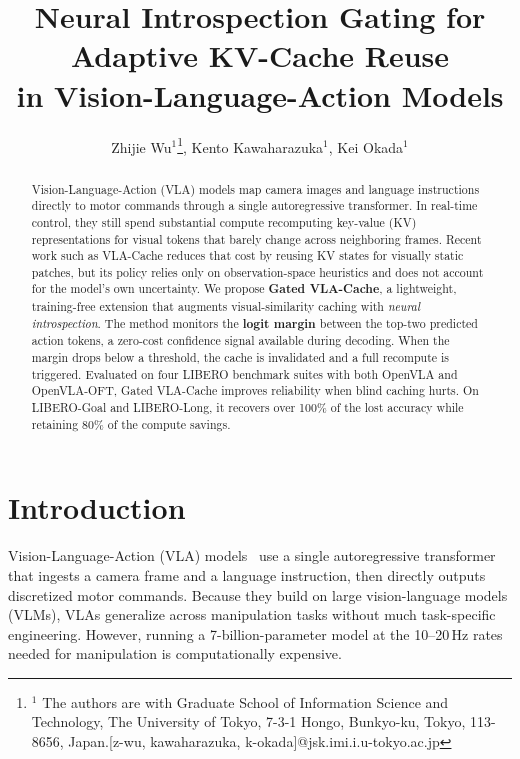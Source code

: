 \documentclass[letterpaper, 10 pt, conference]{ieeeconf}  %
\newcommand{\ourmethod}{Gated VLA-Cache}
\begin{document}
\title{\Large \bf Neural Introspection Gating for Adaptive KV-Cache Reuse\\in Vision-Language-Action Models}
\author{Zhijie Wu$^{1}$\thanks{$^{1}$ The authors are with Graduate School of Information Science and Technology, The University of Tokyo, 7-3-1 Hongo, Bunkyo-ku, Tokyo, 113-8656, Japan.[z-wu, kawaharazuka, k-okada]@jsk.imi.i.u-tokyo.ac.jp}, Kento Kawaharazuka$^{1}$, Kei Okada$^{1}$}

\maketitle


\begin{abstract}
Vision-Language-Action (VLA) models map camera images and language
instructions directly to motor commands through a single autoregressive
transformer.
In real-time control, they still spend substantial compute recomputing
key-value (KV) representations for visual tokens that barely change across
neighboring frames.
Recent work such as VLA-Cache reduces that cost by reusing KV states for
visually static patches, but its policy relies only on observation-space
heuristics and does not account for the model's own uncertainty.
%
We propose \textbf{\ourmethod{}}, a lightweight, training-free extension
that augments visual-similarity caching with \emph{neural introspection}.
The method monitors the \textbf{logit margin} between the top-two predicted
action tokens, a zero-cost confidence signal available during decoding.
When the margin drops below a threshold, the cache is invalidated and a
full recompute is triggered.
%
Evaluated on four LIBERO benchmark suites with both OpenVLA and
OpenVLA-OFT, \ourmethod{} improves reliability when blind caching hurts.
On LIBERO-Goal and LIBERO-Long, it recovers over 100\% of the lost accuracy
while retaining 80\% of the compute savings.
\end{abstract}

\section{Introduction}\label{sec:intro}

Vision-Language-Action (VLA) models~\cite{kim2024openvla,zitkovich2023rt,black2024pi_0}
use a single autoregressive transformer that ingests a camera frame and a
language instruction, then directly outputs discretized motor commands.
Because they build on large vision-language models (VLMs), VLAs
generalize across manipulation tasks without much task-specific
engineering.
However, running a 7-billion-parameter model at the 10--20\,Hz rates
needed for manipulation is computationally expensive.
\end{document}
